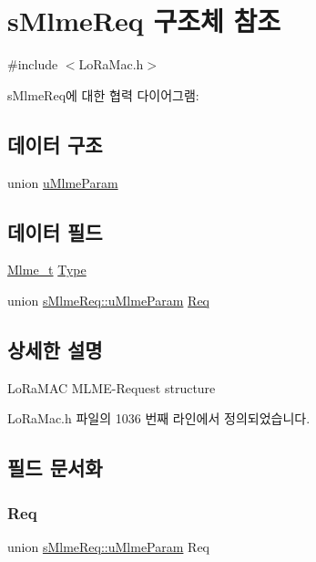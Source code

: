 \hypertarget{structs_mlme_req}{}\section{s\+Mlme\+Req 구조체 참조}
\label{structs_mlme_req}


{\ttfamily \#include $<$Lo\+Ra\+Mac.\+h$>$}



s\+Mlme\+Req에 대한 협력 다이어그램\+:
\subsection*{데이터 구조}
\begin{DoxyCompactItemize}
\item 
union \mbox{\hyperlink{unions_mlme_req_1_1u_mlme_param}{u\+Mlme\+Param}}
\end{DoxyCompactItemize}
\subsection*{데이터 필드}
\begin{DoxyCompactItemize}
\item 
\mbox{\hyperlink{group___l_o_r_a_m_a_c_ga663544b83d50ec3518608be495896809}{Mlme\+\_\+t}} \mbox{\hyperlink{structs_mlme_req_a83b9239b834fa1a95fba118c0a392a8b}{Type}}
\item 
union \mbox{\hyperlink{unions_mlme_req_1_1u_mlme_param}{s\+Mlme\+Req\+::u\+Mlme\+Param}} \mbox{\hyperlink{structs_mlme_req_ae8fae82634858192f75515c1b7daaadc}{Req}}
\end{DoxyCompactItemize}


\subsection{상세한 설명}
Lo\+Ra\+M\+AC M\+L\+M\+E-\/\+Request structure 

Lo\+Ra\+Mac.\+h 파일의 1036 번째 라인에서 정의되었습니다.



\subsection{필드 문서화}
\mbox{\label{structs_mlme_req_ae8fae82634858192f75515c1b7daaadc}} 
\subsubsection{\texorpdfstring{Req}{Req}}
{\footnotesize\ttfamily union \mbox{\hyperlink{unions_mlme_req_1_1u_mlme_param}{s\+Mlme\+Req\+::u\+Mlme\+Param}} Req}

